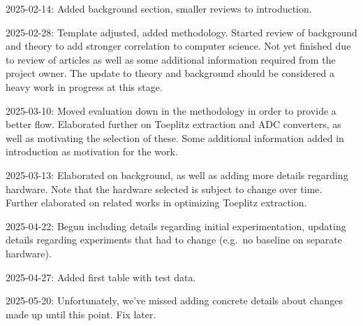 2025-02-14: Added background section, smaller reviews to introduction.

2025-02-28: Template adjusted, added methodology. Started review of background and theory to add stronger correlation to computer science. Not yet finished due to review of articles as well as some additional information required from the project owner. The update to theory and background should be considered a heavy work in progress at this stage.

2025-03-10: Moved evaluation down in the methodology in order to provide a better flow. Elaborated further on Toeplitz extraction and ADC converters, as well as motivating the selection of these. Some additional information added in introduction as motivation for the work.

2025-03-13: Elaborated on background, as well as adding more details regarding hardware. Note that the hardware selected is subject to change over time. Further elaborated on related works in optimizing Toeplitz extraction.

2025-04-22: Begun including details regarding initial experimentation, updating details regarding experiments that had to change (e.g.~no baseline on separate hardware).

2025-04-27: Added first table with test data.

2025-05-20: Unfortunately, we've missed adding concrete details about changes made up until this point. Fix later.
